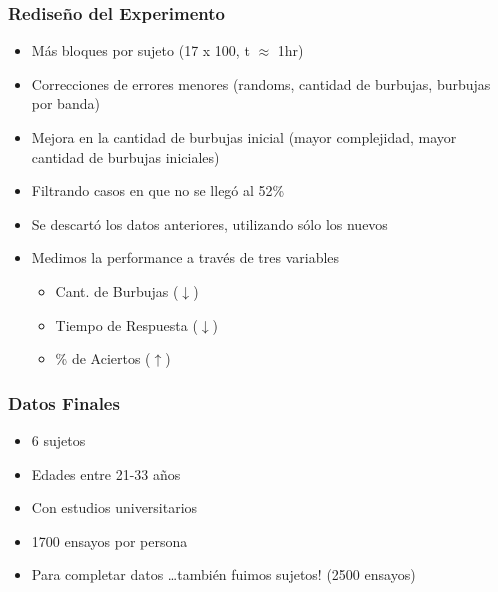 \documentclass[10pt]{beamer}
\begin{document}
	\begin{frame}
	\frametitle{Redise\~no del Experimento}
	    \begin{itemize}
		\item Más bloques por sujeto (17 x 100, t $\approx$ 1hr)
		\item Correcciones de errores menores (randoms, cantidad de burbujas, burbujas por banda)
		\item Mejora en la cantidad de burbujas inicial (mayor complejidad, mayor cantidad de burbujas iniciales)
		\item Filtrando casos en que no se llegó al 52\% \pause
		\item Se descartó los datos anteriores, utilizando sólo los nuevos
		\item Medimos la performance a través de tres variables
		\begin{itemize}
			\item Cant. de Burbujas ($\downarrow$)
			\item Tiempo de Respuesta ($\downarrow$)
			\item \% de Aciertos ($\uparrow$)
		\end{itemize}
    
	    \end{itemize}
	\end{frame}

	\begin{frame}
	\frametitle{Datos Finales}
	    \begin{itemize}
		\item 6 sujetos
		\item Edades entre 21-33 años
		\item Con estudios universitarios
		\item 1700 ensayos por persona\pause
		\item Para completar datos \ldots\pause también fuimos sujetos! (2500 ensayos)
	    \end{itemize}
	\end{frame}


\end{document}
